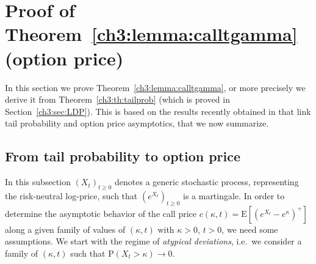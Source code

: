 \documentclass[a4paper,reqno,11pt]{amsart}
\numberwithin{equation}{section}
\newcommand{\PEfont}{\mathrm}
\renewcommand{\P}{\ensuremath{\PEfont P}}
\newcommand{\E}{\ensuremath{\PEfont E}}
\renewcommand{\epsilon}{\varepsilon}
\newcommand\sfc{\mathsf{c}}
\newcommand\sff{\mathsf{f}}
\newcommand\blue{\color{blue}}
\begin{document}






\section{Proof of Theorem~\ref{ch3:lemma:calltgamma} (option price)}
\label{ch3:sec:lemma:calltgamma}

In this section we prove Theorem~\ref{ch3:lemma:calltgamma}, or more precisely
we derive it from Theorem~\ref{ch3:th:tailprob} 
(which is proved in Section~\ref{ch3:sec:LDP}). This is based
on the results recently obtained in \cite{cf:CC} that link
tail probability and option price asymptotics, that we now summarize.



\subsection{From tail probability to option price}
\label{ch3:sec:reminders}
In this subsection $(X_t)_{t\ge 0}$ denotes a generic stochastic process,
representing the risk-neutral log-price, such that
$(e^{X_t})_{t\ge 0}$ is a martingale.
In order to determine the asymptotic behavior of the call price $c(\kappa,t) =
\E[(e^{X_t}-e^\kappa)^+]$ along a given family of values of $(\kappa,t)$
with $\kappa > 0$, $t > 0$,
we need some assumptions.
We start with the regime of \emph{atypical deviations}, i.e.\ we consider a family
of $(\kappa,t)$ such that $\P(X_t>\kappa) \to 0$. 
 
\end{document}
